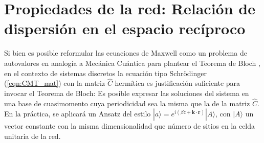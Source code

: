 \section{Propiedades de la red: Relación de dispersión en el espacio recíproco}

Si bien es posible reformular las ecuaciones de Maxwell como un problema de autovalores en analogía a Mecánica Cuántica para plantear el Teorema de Bloch \cite{joannopoulos_photonic_2008}, en el contexto de sistemas discretos la ecuación tipo Schrödinger (\ref{eqn:CMT_mat}) con la matriz $\hat{C}$ hermítica es justificación suficiente para invocar el Teorema de Bloch: Es posible expresar las soluciones del sistema en una base de cuasimomento cuya periodicidad sea la misma que la de la matriz $\hat{C}$. En la práctica, se aplicará un Ansatz del estilo $|a\rangle = e^{i(\beta z + \textbf{k}\cdot \textbf{r})}|A\rangle$, con $|A\rangle$ un vector constante con la misma dimensionalidad que número de sitios en la celda unitaria de la red.

